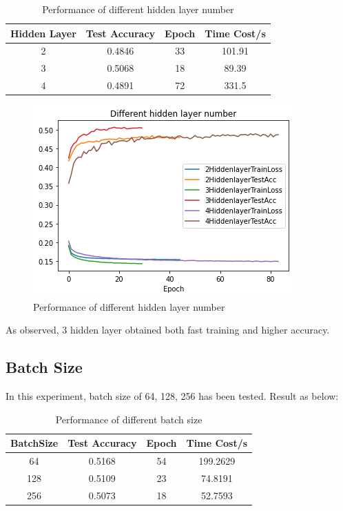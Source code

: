 \documentclass{article}[12pt]
\begin{document}
\begin{table}[H]\label{tab:table}
    \centering
    \begin{tabular}{|c|c|c|c|}
        \hline
        Hidden Layer & Test Accuracy & Epoch & Time Cost/s\\\hline
        2 & 0.4846 & 33 & 101.91\\\hline
        3 & 0.5068 & 18 & 89.39\\\hline
        4 & 0.4891 & 72 & 331.5\\\hline
    \end{tabular}
    \caption{Performance of different hidden layer number}
\end{table}

\begin{figure}[H]
    \centering
    \includegraphics[scale=0.5]{Figures/1.Hiddenlayers/download}
    \caption{Performance of different hidden layer number}
\end{figure}

    As observed, 3 hidden layer obtained both fast training and higher accuracy.

\subsection{Batch Size}
    In this experiment, batch size of 64, 128, 256 has been tested. Result as below:

\begin{table}[H]\label{tab:table}
    \centering
    \begin{tabular}{|c|c|c|c|}
        \hline
        BatchSize & Test Accuracy & Epoch & Time Cost/s\\\hline
        64 & 0.5168 & 54 & 199.2629\\\hline
        128 & 0.5109 & 23 & 74.8191\\\hline
        256 & 0.5073 & 18 & 52.7593\\\hline
    \end{tabular}
    \caption{Performance of different batch size}
\end{table}
\end{document}
